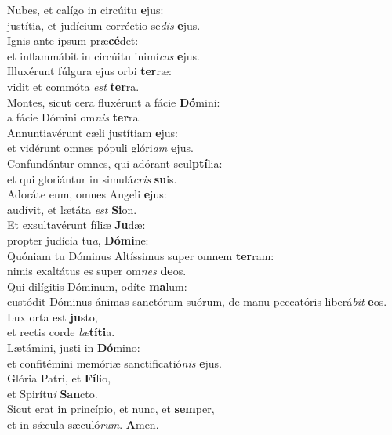 \evenverse Nubes, et calígo in circúitu \textbf{e}jus:~\*\\
\evenverse justítia, et judícium corréctio se\textit{dis} \textbf{e}jus.\\
\oddverse Ignis ante ipsum præ\textbf{cé}det:~\*\\
\oddverse et inflammábit in circúitu inimí\textit{cos} \textbf{e}jus.\\
\evenverse Illuxérunt fúlgura ejus orbi \textbf{ter}ræ:~\*\\
\evenverse vidit et commóta \textit{est} \textbf{ter}ra.\\
\oddverse Montes, sicut cera fluxérunt a fácie \textbf{Dó}mini:~\*\\
\oddverse a fácie Dómini om\textit{nis} \textbf{ter}ra.\\
\evenverse Annuntiavérunt cæli justítiam \textbf{e}jus:~\*\\
\evenverse et vidérunt omnes pópuli glóri\textit{am} \textbf{e}jus.\\
\oddverse Confundántur omnes, qui adórant scul\textbf{ptí}lia:~\*\\
\oddverse et qui gloriántur in simulá\textit{cris} \textbf{su}is.\\
\evenverse Adoráte eum, omnes Angeli \textbf{e}jus:~\*\\
\evenverse audívit, et lætáta \textit{est} \textbf{Si}on.\\
\oddverse Et exsultavérunt fíliæ \textbf{Ju}dæ:~\*\\
\oddverse propter judícia tu\textit{a}, \textbf{Dó}\textbf{mi}ne:\\
\evenverse Quóniam tu Dóminus Altíssimus super omnem \textbf{ter}ram:~\*\\
\evenverse nimis exaltátus es super om\textit{nes} \textbf{de}os.\\
\oddverse Qui dilígitis Dóminum, odíte \textbf{ma}lum:~\*\\
\oddverse custódit Dóminus ánimas sanctórum suórum, de manu peccatóris liberá\textit{bit} \textbf{e}os.\\
\evenverse Lux orta est \textbf{ju}sto,~\*\\
\evenverse et rectis corde \textit{læ}\textbf{tí}\textbf{ti}a.\\
\oddverse Lætámini, justi in \textbf{Dó}mino:~\*\\
\oddverse et confitémini memóriæ sanctificatió\textit{nis} \textbf{e}jus.\\
\evenverse Glória Patri, et \textbf{Fí}lio,~\*\\
\evenverse et Spirítu\textit{i} \textbf{San}cto.\\
\oddverse Sicut erat in princípio, et nunc, et \textbf{sem}per,~\*\\
\oddverse et in sǽcula sæculó\textit{rum}. \textbf{A}men.\\
